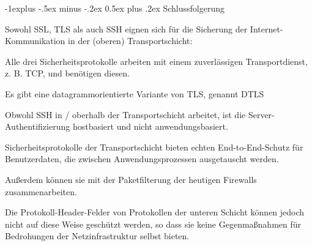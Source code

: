 \documentclass[a4paper]{article}
\makeatletter
\renewcommand{\subsection}{\@startsection{subsection}{2}{0mm}%
 {-1explus -.5ex minus -.2ex}%
 {0.5ex plus .2ex}%
 {\normalfont\normalsize\bfseries}}
\makeatother
\begin{document}
\begin{multicols}{3}
      \subsection{Schlussfolgerung}
      \begin{itemize*}
            \item Sowohl SSL, TLS als auch SSH eignen sich für die Sicherung der Internet-Kommunikation in der (oberen) Transportschicht:
            \begin{itemize*}
                  \item Alle drei Sicherheitsprotokolle arbeiten mit einem zuverlässigen Transportdienst, z. B. TCP, und benötigen diesen.
                  \item Es gibt eine datagrammorientierte Variante von TLS, genannt DTLS
                  \item Obwohl SSH in / oberhalb der Transportschicht arbeitet, ist die Server-Authentifizierung hostbasiert und nicht anwendungsbasiert.
                  \item Sicherheitsprotokolle der Transportschicht bieten echten End-to-End-Schutz für Benutzerdaten, die zwischen Anwendungsprozessen ausgetauscht werden.
                  \item Außerdem können sie mit der Paketfilterung der heutigen Firewalls zusammenarbeiten.
                  \item Die Protokoll-Header-Felder von Protokollen der unteren Schicht können jedoch nicht auf diese Weise geschützt werden, so dass sie keine Gegenmaßnahmen für Bedrohungen der Netzinfrastruktur selbst bieten.
            \end{itemize*}
      \end{itemize*}


\end{multicols}
\end{document}
